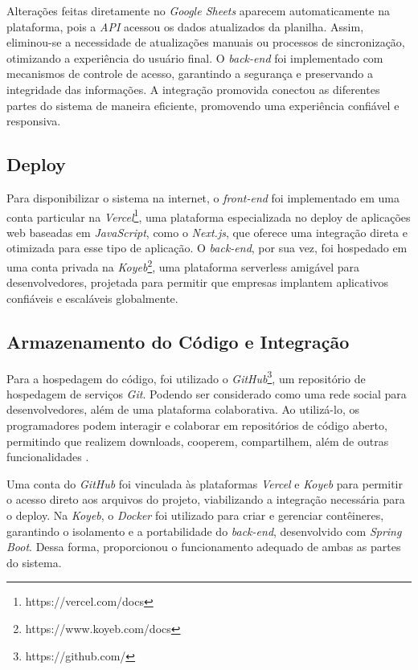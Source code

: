 Alterações feitas diretamente no \textit{Google Sheets} aparecem automaticamente na plataforma, pois a \textit{API} acessou os dados atualizados da planilha. Assim, eliminou-se a necessidade de atualizações manuais ou processos de sincronização, otimizando a experiência do usuário final. O \textit{back-end} foi implementado com mecanismos de controle de acesso, garantindo a segurança e preservando a integridade das informações. A integração promovida conectou as diferentes partes do sistema de maneira eficiente, promovendo uma experiência confiável e responsiva.

\subsection{Deploy}

Para disponibilizar o sistema na internet, o \textit{front-end} foi implementado em uma conta particular na \textit{Vercel}\footnote{https://vercel.com/docs}, uma plataforma especializada no deploy de aplicações web baseadas em \textit{JavaScript}, como o \textit{Next.js}, que oferece uma integração direta e otimizada para esse tipo de aplicação. O \textit{back-end}, por sua vez, foi hospedado em uma conta privada na \textit{Koyeb}\footnote{https://www.koyeb.com/docs}, uma plataforma serverless amigável para desenvolvedores, projetada para permitir que empresas implantem aplicativos confiáveis e escaláveis globalmente.

\subsection{Armazenamento do Código e Integração}

Para a hospedagem do código, foi utilizado o \textit{GitHub}\footnote{https://github.com/}, um repositório de hospedagem de serviços \textit{Git}. Podendo ser considerado como uma rede social para desenvolvedores, além de uma plataforma colaborativa. Ao utilizá-lo, os programadores podem interagir e colaborar em repositórios de código aberto, permitindo que realizem downloads, cooperem, compartilhem, além de outras funcionalidades \cite{silva2024biblioteca}.

Uma conta do \textit{GitHub} foi vinculada às plataformas \textit{Vercel} e \textit{Koyeb} para permitir o acesso direto aos arquivos do projeto, viabilizando a integração necessária para o deploy. Na \textit{Koyeb}, o \textit{Docker} foi utilizado para criar e gerenciar contêineres, garantindo o isolamento e a portabilidade do \textit{back-end}, desenvolvido com \textit{Spring Boot}. Dessa forma, proporcionou o funcionamento adequado de ambas as partes do sistema.

